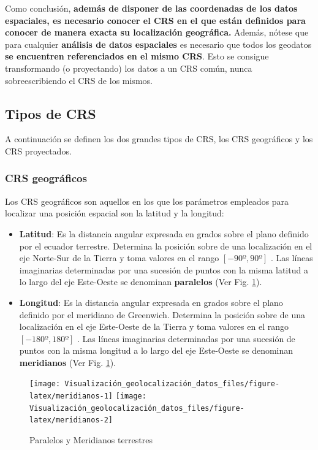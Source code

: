 \documentclass[
]{report}
\theoremstyle{definition}
\theoremstyle{definition}
\theoremstyle{definition}
\theoremstyle{definition}
\theoremstyle{remark}
\begin{document}
Como conclusión, \textbf{además de disponer de las coordenadas de los datos
espaciales, es necesario conocer el CRS en el que están definidos para conocer
de manera exacta su localización geográfica.} Además, nótese que para cualquier
\textbf{análisis de datos espaciales} es necesario que todos los geodatos \textbf{se
encuentren referenciados en el mismo CRS}. Esto se consigue transformando (o
proyectando) los datos a un CRS común, nunca sobreescribiendo el CRS de los
mismos.

\hypertarget{tipos-de-crs}{%
\subsection{Tipos de CRS}\label{tipos-de-crs}}

A continuación se definen los dos grandes tipos de CRS, los CRS geográficos y
los CRS proyectados.

\hypertarget{crs-geogruxe1ficos}{%
\subsubsection{CRS geográficos}\label{crs-geogruxe1ficos}}

Los CRS geográficos son aquellos en los que los parámetros empleados para
localizar una posición espacial son la latitud y la longitud:

\begin{itemize}
\item
  \textbf{Latitud}: Es la distancia angular expresada en grados sobre el plano
  definido por el ecuador terrestre. Determina la posición sobre de una
  localización en el eje Norte-Sur de la Tierra y toma valores en el rango
  \([-90º,90º]\) . Las líneas imaginarias determinadas por una sucesión de
  puntos con la misma latitud a lo largo del eje Este-Oeste se denominan
  \textbf{paralelos} (Ver Fig. \ref{fig:meridianos}).
\item
  \textbf{Longitud}: Es la distancia angular expresada en grados sobre el plano
  definido por el meridiano de Greenwich. Determina la posición sobre de una
  localización en el eje Este-Oeste de la Tierra y toma valores en el rango
  \([-180º,180º]\) . Las líneas imaginarias determinadas por una sucesión de
  puntos con la misma longitud a lo largo del eje Este-Oeste se denominan
  \textbf{meridianos} (Ver Fig. \ref{fig:meridianos}).
\end{itemize}

\begin{figure}

{\centering \texttt{[image: Visualización\_geolocalización\_datos\_files/figure-latex/meridianos-1]} \texttt{[image: Visualización\_geolocalización\_datos\_files/figure-latex/meridianos-2]} 

}

\caption{Paralelos y Meridianos terrestres}\label{fig:meridianos}
\end{figure}
\end{document}
